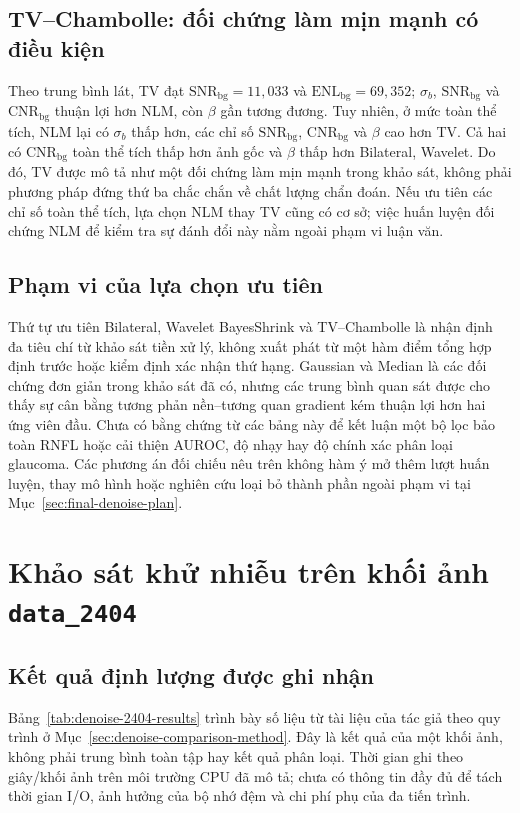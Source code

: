 \documentclass[14pt,a4paper,oneside]{extreport}
\begin{document}
\subsection{TV--Chambolle: đối chứng làm mịn mạnh có điều kiện}
Theo trung bình lát, TV đạt $\mathrm{SNR}_{\mathrm{bg}}=11{,}033$
và $\mathrm{ENL}_{\mathrm{bg}}=69{,}352$; $\sigma_b$,
$\mathrm{SNR}_{\mathrm{bg}}$ và $\mathrm{CNR}_{\mathrm{bg}}$ thuận
lợi hơn NLM, còn $\beta$ gần tương đương. Tuy nhiên, ở mức toàn
thể tích, NLM lại có $\sigma_b$ thấp hơn, các chỉ số
$\mathrm{SNR}_{\mathrm{bg}}$, $\mathrm{CNR}_{\mathrm{bg}}$ và
$\beta$ cao hơn TV. Cả hai có $\mathrm{CNR}_{\mathrm{bg}}$ toàn
thể tích thấp hơn ảnh gốc và $\beta$ thấp hơn Bilateral, Wavelet.
Do đó, TV được mô tả như một đối chứng làm mịn mạnh trong khảo sát, không phải phương
pháp đứng thứ ba chắc chắn về chất lượng chẩn đoán. Nếu ưu tiên
các chỉ số toàn thể tích, lựa chọn NLM thay TV cũng có cơ sở;
việc huấn luyện đối chứng NLM để kiểm tra sự đánh đổi này nằm ngoài phạm vi luận văn.

\subsection{Phạm vi của lựa chọn ưu tiên}
Thứ tự ưu tiên Bilateral, Wavelet BayesShrink và TV--Chambolle là
nhận định đa tiêu chí từ khảo sát tiền xử lý,
không xuất phát từ một hàm điểm tổng hợp định trước hoặc kiểm
định xác nhận thứ hạng. Gaussian và Median là các đối chứng
đơn giản trong khảo sát đã có, nhưng các trung bình quan sát được cho thấy sự cân
bằng tương phản nền--tương quan gradient kém thuận lợi hơn hai
ứng viên đầu. Chưa có bằng chứng từ các bảng này để kết luận
một bộ lọc bảo toàn RNFL hoặc cải thiện AUROC, độ nhạy hay độ
chính xác phân loại glaucoma. Các phương án đối chiếu nêu trên không
hàm ý mở thêm lượt huấn luyện, thay mô hình hoặc nghiên cứu loại bỏ
thành phần ngoài phạm vi tại Mục~\ref{sec:final-denoise-plan}.

\section{Khảo sát khử nhiễu trên khối ảnh \textnormal{\texttt{data\_2404}}}
\label{sec:denoise-comparison-results}

\subsection{Kết quả định lượng được ghi nhận}
Bảng~\ref{tab:denoise-2404-results} trình bày số liệu từ tài liệu của tác giả
theo quy trình ở Mục~\ref{sec:denoise-comparison-method}. Đây là kết quả
của một khối ảnh, không phải trung bình toàn tập hay kết quả phân loại.
Thời gian ghi theo giây/khối ảnh trên môi trường CPU đã mô tả; chưa có
thông tin đầy đủ để tách thời gian I/O, ảnh hưởng của bộ nhớ đệm và chi phí phụ của đa tiến trình.
\end{document}
